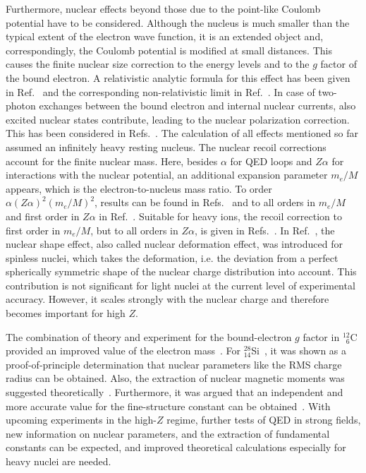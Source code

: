 Furthermore, nuclear effects beyond those due to the point-like Coulomb potential have to be considered. Although the nucleus is much smaller than the typical extent of the electron wave function, it is an extended object and, correspondingly, the Coulomb potential is modified at small distances. This causes the finite nuclear size correction to the energy levels and to the $g$ factor of the bound electron. A relativistic analytic formula for this effect has been given in Ref.~\cite{Glazov2002} and the corresponding non-relativistic limit in Ref.~\cite{karshenboim2000}. In case of two-photon exchanges between the bound electron and internal nuclear currents, also excited nuclear states contribute, leading to the nuclear polarization correction. This has been considered in Refs.~\cite{Nefiodov,volotka2014}. 
The calculation of all effects mentioned so far assumed an infinitely heavy resting nucleus. The nuclear recoil corrections account for the finite nuclear mass. Here, besides $\alpha$ for QED loops and $Z\alpha$ for interactions with the nuclear potential, an additional expansion parameter $m_e/M$ appears, which is the electron-to-nucleus mass ratio. To order $\alpha(Z\alpha)^2(m_e/M)^2$, results can be found in Refs.~\cite{eides2010} and to all orders in $m_e/M$ and first order in $Z\alpha$ in Ref.~\cite{pachucki2010}. Suitable for heavy ions, the recoil correction to first order in $m_e/M$, but to all orders in $Z\alpha$, is given in Refs.~\cite{shabaev2001,Shabaev2002}.
In Ref.~\cite{jacek2012}, the nuclear shape effect, also called nuclear deformation effect, was introduced for spinless nuclei, which takes the deformation, i.e. the deviation from a perfect spherically symmetric shape of the nuclear charge distribution into account. This contribution is not significant for light nuclei at the current level of experimental accuracy. However, it scales strongly with the nuclear charge and therefore becomes important for high $Z$. 

The combination of theory and experiment for the bound-electron $g$ factor in $^{12}_{\phantom{0}6}$C provided an improved value of the electron mass~\cite{Kohler2015,Sturm2014,Zatorski2017}. For $^{28}_{14}$Si~\cite{Sturm2011}, it was shown as a proof-of-principle determination that nuclear parameters like the RMS charge radius can be obtained. Also, the extraction of nuclear magnetic moments was suggested theoretically~\cite{Yerokhin2011,Werth2001}. Furthermore, it was argued that an independent and more accurate value for the fine-structure constant can be obtained~\cite{Shabaev2006,yerokhin2016,Yerokhin2016PRA}. With upcoming experiments in the high-$Z$ regime, further tests of QED in strong fields, new information on nuclear parameters, and the extraction of fundamental constants can be expected, and improved theoretical calculations especially for heavy nuclei are needed.

